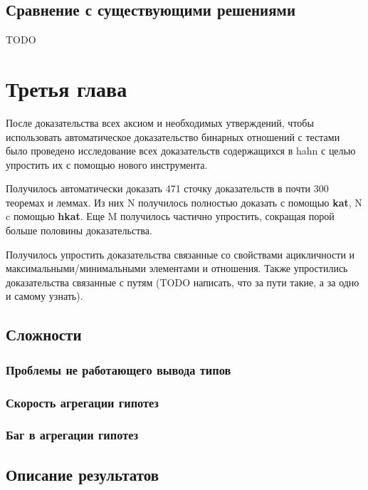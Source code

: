 \documentclass[times
              ]{itmo-student-thesis}
\begin{document}
  \section{Сравнение с существующими решениями}
    TODO

\chapter{Третья глава}

  После доказательства всех аксиом и необходимых утверждений, чтобы использовать автоматическое доказательство бинарных отношений с тестами было проведено исследование всех доказательств содержащихся в hahn с целью упростить их с помощью нового инструмента.

  Получилось автоматически доказать 471 сточку доказательств в почти 300 теоремах и леммах. Из них N получилось полностью доказать с помощью \textbf{kat}, N c помощью \textbf{hkat}.
  Еще M получилось частично упростить, сокращая порой больше половины доказательства.

  Получилось упростить доказательства связанные со свойствами ацикличности и максимальными/минимальными элементами и отношения.
  Также упростились доказательства связанные с путям (TODO написать, что за пути такие, а за одно и самому узнать).

  \section{Сложности}
    \subsection{Проблемы не работающего вывода типов}
    \subsection{Скорость агрегации гипотез}
    \subsection{Баг в агрегации гипотез}
  \section{Описание результатов}




\end{document}
